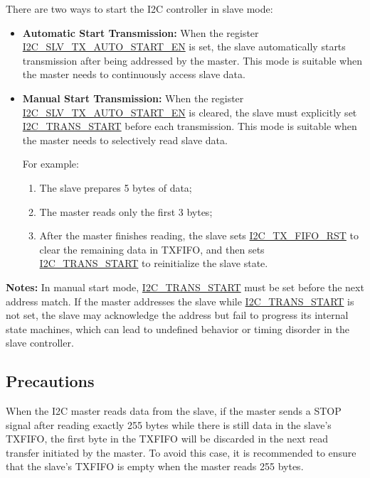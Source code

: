 \documentclass[main\_\_EN.tex]{subfiles}
\begin{document}
There are two ways to start the I2C controller in slave mode:

\begin{itemize}
  \item \textbf{Automatic Start Transmission:}
  When the register \hyperref[fielddesc:I2CSLVTXAUTOSTARTEN]{I2C\_SLV\_TX\_AUTO\_START\_EN} is set, the slave automatically starts transmission after being addressed by the master.
  This mode is suitable when the master needs to continuously access slave data.

  \item \textbf{Manual Start Transmission:}
  When the register \hyperref[fielddesc:I2CSLVTXAUTOSTARTEN]{I2C\_SLV\_TX\_AUTO\_START\_EN} is cleared, the slave must explicitly set \hyperref[fielddesc:I2CTRANSSTART]{I2C\_TRANS\_START} before each transmission. 
  This mode is suitable when the master needs to selectively read slave data.

  For example:
  \begin{enumerate}
    \item The slave prepares 5 bytes of data;
    \item The master reads only the first 3 bytes;
    \item After the master finishes reading, the slave sets \hyperref[fielddesc:I2CTXFIFORST]{I2C\_TX\_FIFO\_RST} to clear the remaining data in TXFIFO, and then sets \hyperref[fielddesc:I2CTRANSSTART]{I2C\_TRANS\_START} to reinitialize the slave state.
  \end{enumerate}
\end{itemize}

{\bfseries Notes:}
In manual start mode, \hyperref[fielddesc:I2CTRANSSTART]{I2C\_TRANS\_START} must be set before the next address match. If the master addresses the slave while \hyperref[fielddesc:I2CTRANSSTART]{I2C\_TRANS\_START} is not set, the slave may acknowledge the address but fail to progress its internal state machines, which can lead to undefined behavior or timing disorder in the slave controller.
\subsection{Precautions}

\begin{tiplisting}
When the I2C master reads data from the slave, if the master sends a STOP signal after reading exactly 255 bytes while there is still data in the slave's TXFIFO, the first byte in the TXFIFO will be discarded in the next read transfer initiated by the master. To avoid this case, it is recommended to ensure that the slave's TXFIFO is empty when the master reads 255 bytes.
\end{tiplisting}
\end{document}
